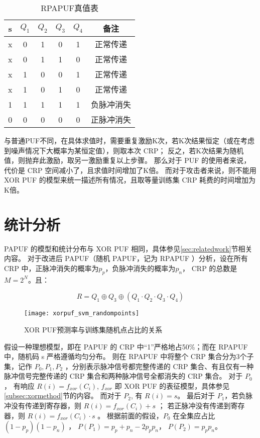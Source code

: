 \begin{table}[h!]
\centering
\caption{RPAPUF真值表}
\label{tab:true-table-rpa}
\begin{tabular}{c|cccc|c}
\hline
s & $ Q_1 $ & $ Q_2 $ & $ Q_3 $ & $ Q_4 $ & 备注 \\
\hline
x & 0 & 1 & 0 & 1 & 正常传递\\
x & 0 & 1 & 1 & 0 & 正常传递\\
x & 1 & 0 & 0 & 1 & 正常传递\\
x & 1 & 0 & 1 & 0 & 正常传递\\
1 & 1 & 1 & 1 & 1 & 负脉冲消失\\
0 & 0 & 0 & 0 & 0 & 正脉冲消失\\
\hline
\end{tabular}
\end{table}

与普通PUF不同，在具体求值时，需要重复激励K次，若K次结果恒定（或在考虑到噪声情况下大概率为某恒定值），则取本次 CRP；
反之，若K次结果为随机值，则抛弃此激励，取另一激励重复以上步骤。
那么对于 PUF 的使用者来说，代价是 CRP 空间减小了，且求值时间增加了K倍。
而对于攻击者来说，则不能用 XOR PUF 的模型来统一描述所有情况，且取等量训练集 CRP 耗费的时间增加为K倍。

\section{统计分析}\label{sec:rpa_stat}
PAPUF 的模型和统计分布与 XOR PUF 相同，具体参见\ref{sec:relatedwork}节相关内容。
对于改进后 PAPUF（随机 PAPUF，记为 RPAPUF ）分析，设在所有 CRP 中，正脉冲消失的概率为$ p_p $，负脉冲消失的概率为$ p_n $， CRP 的总数是 $ M=2^N $。且：

\begin{equation}
R=Q_1\oplus Q_3\oplus (Q_1\cdot Q_2\cdot Q_3\cdot Q_4)
\end{equation}

\begin{figure}[htb!]
\centering
\texttt{[image: xorpuf\_svm\_randompoints]}
\caption{XOR PUF预测率与训练集随机点占比的关系}
\label{fig:xor-svm-random}
\end{figure}

假设一种理想模型，即在 PAPUF 的 CRP 中``1''严格地占50\%；而在 RPAPUF 中，随机码 s 严格遵循均匀分布。
则在 RPAPUF 中将整个 CRP 集合分为3个子集，记作 $ P_{0}, P_{1}, P_{2} $ ，分别表示脉冲信号都完整传递的 CRP 集合、有且仅有一种脉冲信号完整传递的 CRP 集合和两种脉冲信号全都消失的 CRP 集合。
对于 $ P_0 $， 有响应 $ R(i) = f_{xor}(C_i) $, $ f_{xor} $ 即 XOR PUF 的表征模型，具体参见\ref{subsec:xormethod}节的内容。
而对于 $ P_2 $, 有 $ R(i) = s $。
最后对于 $ P_1 $，若负脉冲没有传递到寄存器，则 $ R(i)= f_{xor}(C_i)+s $ ； 若正脉冲没有传递到寄存器，则 $ R(i)=f_{xor}(C_i)\cdot s $ 。
根据前面的假设，$ P_0 $ 在全集应占比 $ (1-p_p)(1-p_n) $ ， $ P(P_1)=p_p+p_n-2p_pp_n $， $ P(P_2)=p_pp_n $。

